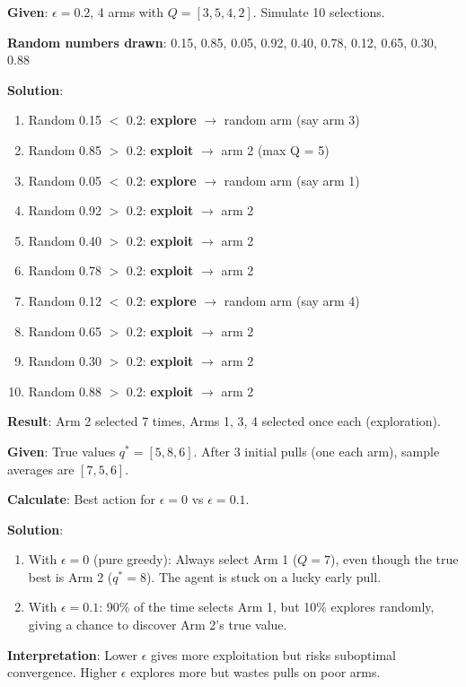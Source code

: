 \documentclass[11pt,a4paper]{article}
\begin{document}
\begin{tcolorbox}[colback=green!5!white,colframe=green!75!black,title=\textbf{Worked Example 5: Epsilon-Greedy with Simulation}]
\textbf{Given}: $\epsilon = 0.2$, 4 arms with $Q = [3, 5, 4, 2]$. Simulate 10 selections.

\textbf{Random numbers drawn}: 0.15, 0.85, 0.05, 0.92, 0.40, 0.78, 0.12, 0.65, 0.30, 0.88

\textbf{Solution}:
\begin{enumerate}
    \item Random 0.15 $<$ 0.2: \textbf{explore} $\to$ random arm (say arm 3)
    \item Random 0.85 $>$ 0.2: \textbf{exploit} $\to$ arm 2 (max Q = 5)
    \item Random 0.05 $<$ 0.2: \textbf{explore} $\to$ random arm (say arm 1)
    \item Random 0.92 $>$ 0.2: \textbf{exploit} $\to$ arm 2
    \item Random 0.40 $>$ 0.2: \textbf{exploit} $\to$ arm 2
    \item Random 0.78 $>$ 0.2: \textbf{exploit} $\to$ arm 2
    \item Random 0.12 $<$ 0.2: \textbf{explore} $\to$ random arm (say arm 4)
    \item Random 0.65 $>$ 0.2: \textbf{exploit} $\to$ arm 2
    \item Random 0.30 $>$ 0.2: \textbf{exploit} $\to$ arm 2
    \item Random 0.88 $>$ 0.2: \textbf{exploit} $\to$ arm 2
\end{enumerate}

\textbf{Result}: Arm 2 selected 7 times, Arms 1, 3, 4 selected once each (exploration).
\end{tcolorbox}

\begin{tcolorbox}[colback=green!5!white,colframe=green!75!black,title=\textbf{Worked Example 6: Comparing Epsilon Values}]
\textbf{Given}: True values $q^* = [5, 8, 6]$. After 3 initial pulls (one each arm), sample averages are $[7, 5, 6]$.

\textbf{Calculate}: Best action for $\epsilon = 0$ vs $\epsilon = 0.1$.

\textbf{Solution}:
\begin{enumerate}
    \item With $\epsilon = 0$ (pure greedy): Always select Arm 1 ($Q = 7$), even though the true best is Arm 2 ($q^* = 8$). The agent is stuck on a lucky early pull.
    \item With $\epsilon = 0.1$: 90\% of the time selects Arm 1, but 10\% explores randomly, giving a chance to discover Arm 2's true value.
\end{enumerate}

\textbf{Interpretation}: Lower $\epsilon$ gives more exploitation but risks suboptimal convergence. Higher $\epsilon$ explores more but wastes pulls on poor arms.
\end{tcolorbox}
\end{document}
